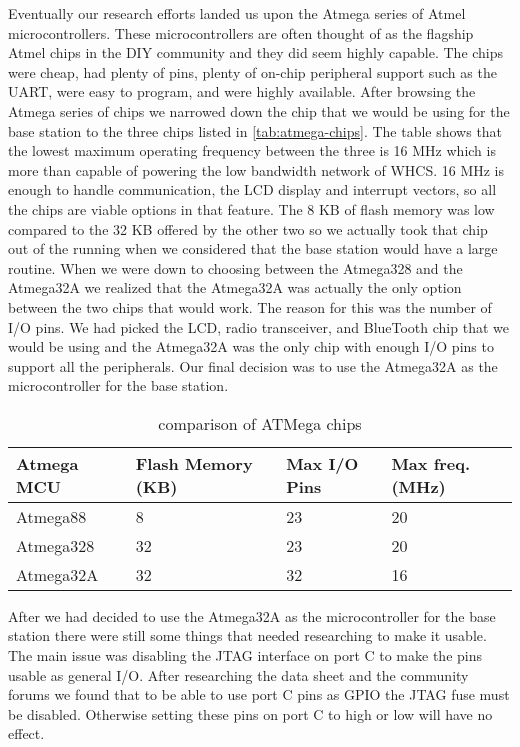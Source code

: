 Eventually our research efforts landed us upon the Atmega series of Atmel
microcontrollers. These microcontrollers are often thought of as the flagship
Atmel chips in the DIY community and they did seem highly capable. The chips
were cheap, had plenty of pins, plenty of on{}-chip peripheral support such as
the UART, were easy to program, and were highly available. After browsing the
Atmega series of chips we narrowed down the chip that we would be using for the
base station to the three chips listed in \autoref{tab:atmega-chips}. The table
shows that the lowest maximum operating frequency between the three is 16 MHz
which is more than capable of powering the low bandwidth network of WHCS. 16
MHz is enough to handle communication, the LCD display and interrupt vectors,
so all the chips are viable options in that feature. The 8 KB of flash memory
was low compared to the 32 KB offered by the other two so we actually took that
chip out of the running when we considered that the base station would have a
large routine. When we were down to choosing between the Atmega328 and the
Atmega32A we realized that the Atmega32A was actually the only option between
the two chips that would work. The reason for this was the number of I/O pins.
We had picked the LCD, radio transceiver, and BlueTooth chip that we would be
using and the Atmega32A was the only chip with enough I/O pins to support all
the peripherals. Our final decision was to use the Atmega32A as the
microcontroller for the base station.

\begin{table}[H]
\centering
\begin{tabular}{|l|l|l|l|}
\hline
{\color{black} Atmega MCU} &
{\color{black} Flash Memory (KB)} &
{\color{black} Max I/O Pins} &
{\color{black} Max freq. (MHz)}\\\hline
{\color{black} Atmega88} &
{\color{black} 8} &
{\color{black} 23} &
{\color{black} 20}\\\hline
{\color{black} Atmega328} &
{\color{black} 32} &
{\color{black} 23} &
{\color{black} 20}\\\hline
{\color{black} Atmega32A} &
{\color{black} 32} &
{\color{black} 32} &
{\color{black} 16}\\\hline
\end{tabular}
\caption{comparison of ATMega chips}
\label{tab:atmega-chips}
\end{table}

After we had decided to use the Atmega32A as the microcontroller for the base
station there were still some things that needed researching to make it usable.
The main issue was disabling the JTAG interface on port C to make the pins
usable as general I/O. After researching the data sheet and the community
forums we found that to be able to use port C pins as GPIO the JTAG fuse must
be disabled. Otherwise setting these pins on port C to high or low will have no
effect.

